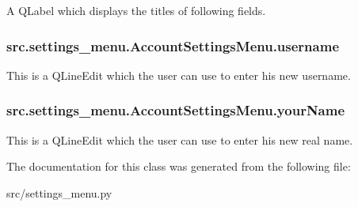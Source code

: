 A Q\+Label which displays the titles of following fields. 

\hypertarget{classsrc_1_1settings__menu_1_1_account_settings_menu_a54d0681d7b2c05bc084bf686a5e0cf41}{}
\subsubsection[{username}]{\setlength{\rightskip}{0pt plus 5cm}src.\+settings\+\_\+menu.\+Account\+Settings\+Menu.\+username}\label{classsrc_1_1settings__menu_1_1_account_settings_menu_a54d0681d7b2c05bc084bf686a5e0cf41}


This is a Q\+Line\+Edit which the user can use to enter his new username. 

\hypertarget{classsrc_1_1settings__menu_1_1_account_settings_menu_a72d6db1fc6e6253916fec2090e8ff914}{}
\subsubsection[{your\+Name}]{\setlength{\rightskip}{0pt plus 5cm}src.\+settings\+\_\+menu.\+Account\+Settings\+Menu.\+your\+Name}\label{classsrc_1_1settings__menu_1_1_account_settings_menu_a72d6db1fc6e6253916fec2090e8ff914}


This is a Q\+Line\+Edit which the user can use to enter his new real name. 



The documentation for this class was generated from the following file\+:\begin{DoxyCompactItemize}
\item 
src/settings\+\_\+menu.\+py\end{DoxyCompactItemize}
